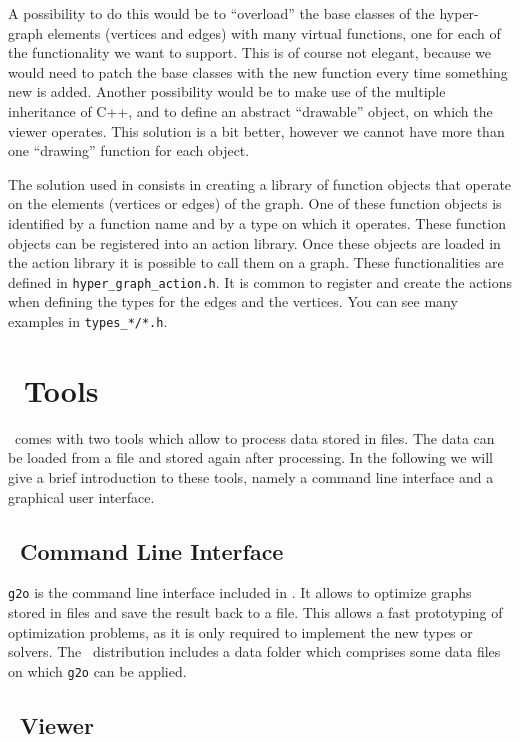 \documentclass[a4paper]{article}
\begin{document}
A possibility to do this would be to ``overload'' the base classes of
the hyper-graph elements (vertices and edges) with many virtual
functions, one for each of the functionality we want to support.  This
is of course not elegant, because we would need to patch the base
classes with the new function every time something new is added.
Another possibility would be to make use of the multiple inheritance
of C++, and to define an abstract ``drawable'' object, on which the
viewer operates.  This solution is a bit better, however we cannot
have more than one ``drawing'' function for each object.

The solution used in \gopt{} consists in creating a library of
function objects that operate on the elements (vertices or edges) of
the graph.  One of these function objects is identified by a function
name and by a type on which it operates.  These function objects can
be registered into an action library.  Once these objects are loaded
in the action library it is possible to call them on a graph.  These
functionalities are defined in \verb+hyper_graph_action.h+.  It is
common to register and create the actions when defining the types for
the edges and the vertices.  You can see many examples in
\verb+types_*/*.h+.

\section{\gopt\ Tools}
\gopt\ comes with two tools which allow to process data stored in
files. The data can be loaded from a file and stored again after
processing. In the following we will give a brief introduction to these
tools, namely a command line interface and a graphical user interface.

\subsection{\gopt\ Command Line Interface}

\verb+g2o+ is the command line interface included in \gopt. It
allows to optimize graphs stored in files and save the result back to a
file. This allows a fast prototyping of optimization problems, as it is
only required to implement the new types or solvers. The \gopt\
distribution includes a data folder which comprises some data files on
which \verb+g2o+ can be applied.

\subsection{\gopt\ Viewer}
\end{document}
